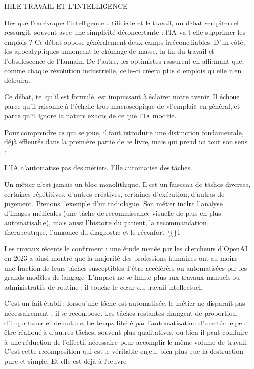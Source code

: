 \begin{partdivider}{III}{LE TRAVAIL ET L'INTELLIGENCE}\end{partdivider}


Dès que l'on évoque l'intelligence artificielle et le travail, un débat sempiternel ressurgit, souvent avec une simplicité déconcertante : l'IA va-t-elle supprimer les emplois ? Ce débat oppose généralement deux camps irréconciliables. D'un côté, les apocalyptiques annoncent le chômage de masse, la fin du travail et l'obsolescence de l'humain. De l'autre, les optimistes rassurent en affirmant que, comme chaque révolution industrielle, celle-ci créera plus d'emplois qu'elle n'en détruira.

Ce débat, tel qu'il est formulé, est impuissant à éclairer notre avenir. Il échoue parce qu'il raisonne à l'échelle trop macroscopique de «l'emploi» en général, et parce qu'il ignore la nature exacte de ce que l'IA modifie.

Pour comprendre ce qui se joue, il faut introduire une distinction fondamentale, déjà effleurée dans la première partie de ce livre, mais qui prend ici tout son sens :

\begin{aiquote}[s]
\qbold L'IA n'automatise pas des métiers. Elle automatise des tâches.
\end{aiquote}

Un métier n'est jamais un bloc monolithique. Il est un faisceau de tâches diverses, certaines répétitives, d'autres créatives, certaines d'exécution, d'autres de jugement. Prenons l'exemple d'un radiologue. Son métier inclut l'analyse d'images médicales (une tâche de reconnaissance visuelle de plus en plus automatisable), mais aussi l'histoire du patient, la recommandation thérapeutique, l'annonce du diagnostic et le réconfort \textbackslash\{\}1

Les travaux récents le confirment : une étude menée par les chercheurs d'OpenAI en 2023 a ainsi montré que la majorité des professions humaines ont au moins une fraction de leurs tâches susceptibles d'être accélérées ou automatisées par les grands modèles de langage. L'impact ne se limite plus aux travaux manuels ou administratifs de routine ; il touche le cœur du travail intellectuel.

C'est un fait établi : lorsqu'une tâche est automatisée, le métier ne disparaît pas nécessairement ; il se recompose. Les tâches restantes changent de proportion, d'importance et de nature. Le temps libéré par l'automatisation d'une tâche peut être réalloué à d'autres tâches, souvent plus qualitatives, ou bien il peut conduire à une réduction de l'effectif nécessaire pour accomplir le même volume de travail. C'est cette recomposition qui est le véritable enjeu, bien plus que la destruction pure et simple. Et elle est déjà à l'œuvre.

